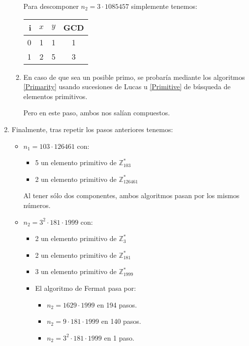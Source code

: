\begin{enumerate}
\begin{enumerate}
			Para descomponer $n_2 = 3 \cdot 1085457$ simplemente tenemos:
			\begin{center}
			\begin{tabular}{ | r | c | c | c |}
				\hline
				i   & $x$       & $y$       & GCD \\
				\hline
				0   & 1         & 1         & 1 \\
				1   & 2         & 5         & 3 \\
				\hline
			\end{tabular}
			\end{center}

			\item En caso de que sea un posible primo, se probaría mediante los algoritmos \ref{Primarity} usando
			sucesiones de Lucas u \ref{Primitive} de búsqueda de elementos primitivos.
			
			Pero en este paso, ambos nos salían compuestos.
		\end{enumerate}
		
		\item Finalmente, tras repetir los pasos anteriores tenemos:
		\begin{itemize}
			\item $n_1 = 103 \cdot 126461$ con:
			\begin{itemize}
				\item 5 un elemento primitivo de $\mathbb{Z}^*_{103}$
				\item 2 un elemento primitivo de $\mathbb{Z}^*_{126461}$
			\end{itemize}
			Al tener sólo dos componentes, ambos algoritmos pasan por los mismos números.
			
			\item $n_2 = 3^2 \cdot 181 \cdot 1999$ con:
			\begin{itemize}
				\item 2 un elemento primitivo de $\mathbb{Z}^*_{3}$
				\item 2 un elemento primitivo de $\mathbb{Z}^*_{181}$
				\item 3 un elemento primitivo de $\mathbb{Z}^*_{1999}$
				\item El algoritmo de Fermat pasa por:
				\begin{itemize}
					\item $n_2 = 1629 \cdot 1999$ en 194 pasos.
					\item $n_2 = 9 \cdot 181 \cdot 1999$ en 140 pasos.
					\item $n_2 = 3^2 \cdot 181 \cdot 1999$ en 1 paso.
				\end{itemize}
				

\end{itemize}
\end{itemize}
\end{enumerate}

